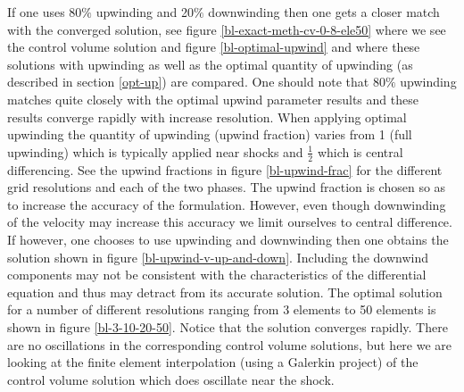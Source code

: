 If one uses 80$\%$ upwinding and 20$\%$ downwinding then 
one gets a closer match with the converged solution, 
see figure \ref{bl-exact-meth-cv-0-8-ele50} where we see the 
control volume solution and figure \ref{bl-optimal-upwind} 
and where these solutions with upwinding as well as 
the optimal quantity of upwinding (as described in section \ref{opt-up}) 
are compared. 
One should note that 80$\%$ upwinding matches quite closely with the 
optimal upwind parameter results and these results converge rapidly 
with increase resolution. When applying optimal upwinding 
the quantity of upwinding (upwind fraction) varies from 
1 (full upwinding) which is typically applied near shocks 
and $\frac{1}{2}$ which is central differencing. See 
the upwind fractions in figure \ref{bl-upwind-frac} for the 
different grid resolutions and each of the two phases. 
The upwind fraction is chosen so as to increase the accuracy 
of the formulation. However, even though downwinding of the 
velocity may increase this accuracy we limit ourselves to 
central difference. If however, one chooses to use 
upwinding and downwinding then one obtains the solution 
shown in figure \ref{bl-upwind-v-up-and-down}. Including 
the downwind components may not be consistent with the characteristics 
of the differential equation and thus may detract from 
its accurate solution. The optimal solution for a number 
of different resolutions ranging from 3 elements to 50 elements 
is shown in figure \ref{bl-3-10-20-50}. Notice that 
the solution converges rapidly. There are no oscillations in 
the corresponding control volume solutions, but here we are 
looking at the finite element interpolation (using a Galerkin 
project) of the control volume solution which does oscillate 
near the shock. 

 











